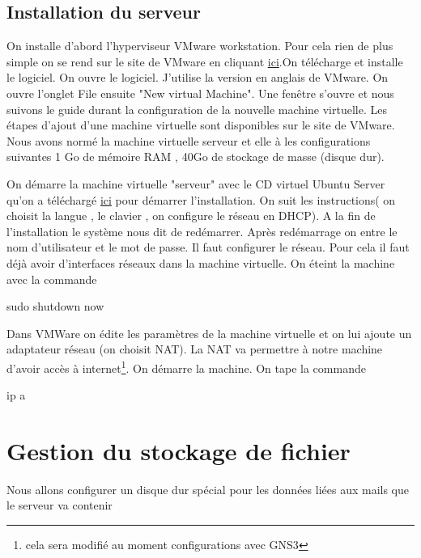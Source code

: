 \documentclass[a4paper,12pt,french]{report} %
\begin{document}
\subsection{Installation du serveur}
	On installe d'abord l'hyperviseur VMware workstation. Pour cela rien de plus simple on se rend sur le site de VMware en cliquant \href{https://my.vmware.com/en/web/vmware/free}{ici}.On télécharge et installe le logiciel. On ouvre le logiciel. J'utilise la version en anglais de VMware. On ouvre l'onglet File ensuite "New virtual Machine". Une fenêtre s'ouvre et nous suivons le guide durant la configuration de la nouvelle machine virtuelle. Les étapes d'ajout d'une machine virtuelle sont disponibles sur le site de VMware. Nous avons normé la machine virtuelle serveur et elle à les configurations suivantes 1 Go de mémoire RAM , 40Go de stockage de masse (disque dur).

	On démarre la machine virtuelle "serveur" avec le CD virtuel Ubuntu Server qu'on a téléchargé \href{https://my.vmware.com/en/web/vmware/free}{ici} pour démarrer l'installation. On suit les instructions( on choisit la langue , le clavier , on configure le réseau en DHCP). A la fin de l'installation le système nous dit de redémarrer. Après redémarrage on entre le nom d'utilisateur et le mot de passe. Il faut configurer le réseau. 
Pour cela il faut déjà avoir d'interfaces réseaux dans la machine virtuelle. On éteint la machine avec la commande 
\begin{exempleConsole}
	sudo shutdown now 
\end{exempleConsole}
Dans VMWare on édite les paramètres de la machine virtuelle et on lui ajoute %
un adaptateur réseau (on choisit NAT). La NAT va permettre à notre machine d'avoir accès à internet\footnote{cela sera modifié au moment configurations avec GNS3}. On démarre la machine. On tape la commande
\begin{exempleConsole}
ip a
\end{exempleConsole}

\section{Gestion du stockage de fichier}
	Nous allons configurer un disque dur spécial pour les données liées aux mails que le serveur va contenir
	
\end{document}
